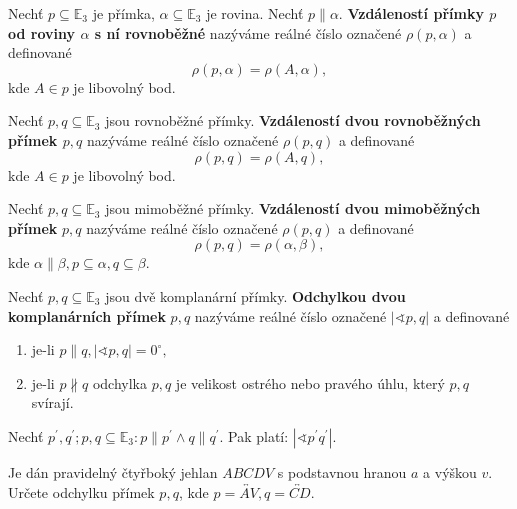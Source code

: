 \begin{definition}
    Nechť $p\subseteq \mathbb E_3$ je přímka, $\alpha \subseteq \mathbb E_3$ je rovina.
    Nechť $p\parallel \alpha.$ \textbf{Vzdáleností přímky $p$ od roviny $\alpha$
    s ní rovnoběžné} nazýváme reálné číslo označené $\rho(p,\alpha)$ a definované
    $$\rho(p,\alpha)=\rho(A,\alpha),$$
    kde $A\in p$ je libovolný bod.
\end{definition}

\begin{definition}
    Nechť $p,q\subseteq \mathbb E_3$ jsou rovnoběžné přímky. \textbf{Vzdáleností
    dvou rovnoběžných přímek $p,q$} nazýváme reálné číslo označené $\rho(p,q)$ a
    definované
    $$\rho(p,q) = \rho(A,q),$$
    kde $A\in p$ je libovolný bod.
\end{definition}

\begin{definition}
    Nechť $p,q\subseteq \mathbb E_3$ jsou mimoběžné přímky. \textbf{Vzdáleností dvou
    mimoběžných přímek} $p,q$ nazýváme reálné číslo označené $\rho(p,q)$ a definované
    $$\rho(p,q)=\rho(\alpha, \beta),$$
    kde $\alpha \parallel \beta, p\subseteq\alpha, q\subseteq \beta.$
\end{definition}

\begin{definition}
    Nechť $p,q\subseteq \mathbb E_3$ jsou dvě komplanární přímky. \textbf{Odchylkou
    dvou komplanárních přímek} $p,q$ nazýváme reálné číslo označené $|\sphericalangle
    p,q|$ a definované
    \begin{enumerate}[$i.$]
    \item je-li $p\parallel q, |\sphericalangle p,q|=0^\circ,$
   	\item je-li $p\nparallel q$ odchylka $p,q$ je velikost ostrého nebo pravého úhlu,
        který $p,q$ svírají.
    \end{enumerate}
\end{definition}

\begin{veta}
    Nechť $p^\prime, q^\prime; p,q\subseteq \mathbb E_3: p\parallel p^\prime\land
    q\parallel q^\prime.$ Pak platí: $|\sphericalangle p^\prime q^\prime|.$
\end{veta}

\begin{priklad}
Je dán pravidelný čtyřboký jehlan $ABCDV$ s podstavnou hranou $a$ a výškou $v$.
Určete odchylku přímek $p,q$, kde $p=\overleftrightarrow{AV}, q=\overleftrightarrow{CD}.$
\end{priklad}

